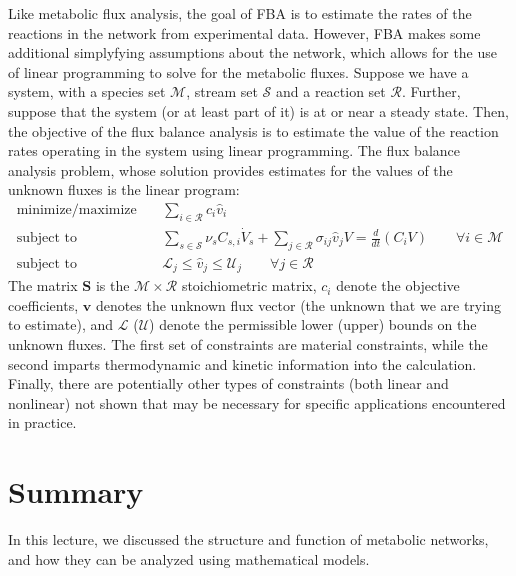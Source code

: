 \documentclass{article}[11pt]
\begin{document}
Like metabolic flux analysis, the goal of FBA is to estimate the rates of the reactions in the network from experimental data.
However, FBA makes some additional simplyfying assumptions about the network, which allows for the use of linear programming to solve for the metabolic fluxes.
Suppose we have a system, with a species set $\mathcal{M}$, stream set $\mathcal{S}$ and a reaction set $\mathcal{R}$. 
Further, suppose that the system (or at least part of it) is at or near a steady state. 
Then, the objective of the flux balance analysis is to estimate the value of the reaction rates operating in the system using linear programming.
The flux balance analysis problem, whose solution provides estimates for the values of the unknown fluxes is the linear program: 
\begin{eqnarray*}
\text{minimize/maximize}~& & \sum_{i\in\mathcal{R}}c_{i}\hat{v}_{i}\\
\text{subject to} & & \sum_{s\in\mathcal{S}}\nu_{s}C_{s,i}\dot{V}_{s} + \sum_{j\in\mathcal{R}}\sigma_{ij}\hat{v}_{j}V = \frac{d}{dt}\left(C_{i}V\right)\qquad\forall{i\in\mathcal{M}}\\
\text{subject to} & & \mathcal{L}_{j}\leq\hat{v}_{j}\leq\mathcal{U}_{j}\qquad\forall{j\in\mathcal{R}}
\end{eqnarray*}
The matrix $\mathbf{S}$ is the $\mathcal{M}\times\mathcal{R}$ stoichiometric matrix, $c_{i}$ denote the objective coefficients, 
$\mathbf{v}$ denotes the unknown flux vector (the unknown that we are trying to estimate), and 
$\mathcal{L}$ ($\mathcal{U}$) denote the permissible lower (upper) bounds on the unknown fluxes. 
The first set of constraints are material constraints, 
while the second imparts thermodynamic and kinetic information into the calculation. 
Finally, there are potentially other types of constraints (both linear and nonlinear) not shown 
that may be necessary for specific applications encountered in practice.

\section{Summary}
In this lecture, we discussed the structure and function of metabolic networks, and how they can be analyzed using mathematical models.






\end{document}
